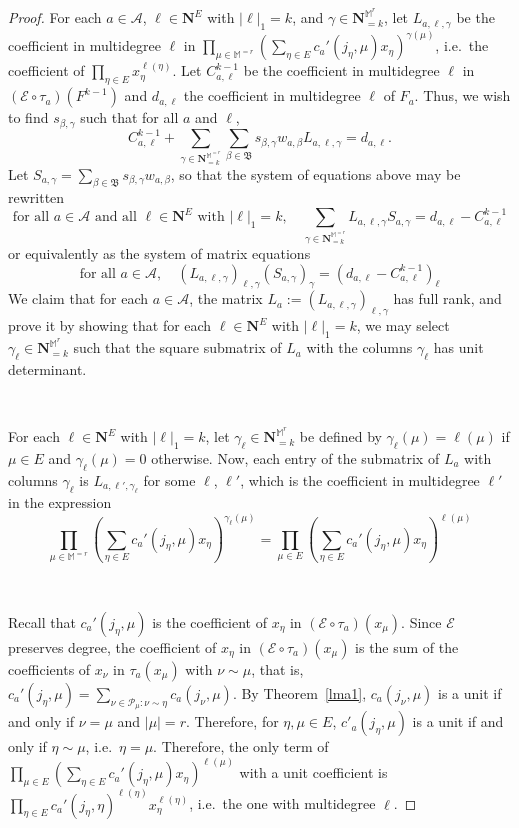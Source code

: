 \documentclass[10pt]{amsart}
\theoremstyle{Theorem}
\theoremstyle{definition}
\newcommand{\NN}{\mathbf N}
\newcommand{\cA}{\mathcal{A}}
\newcommand{\cE}{\mathcal{E}}
\newcommand{\cP}{\mathcal{P}}
\def\cs{s}
\begin{document}
\begin{proof}
For each $a\in \cA$, $\ell\in \NN^E$ with $|\ell|_1=k$, and $\gamma\in \NN_{=k}^{\mathbb M^r}$, let $L_{a,\ell,\gamma}$ be the coefficient in multidegree $\ell$ in $\prod_{\mu\in \mathbb{M}^{=r}}\left(\sum_{\eta\in E}c_a'(j_\eta,\mu)x_\eta\right)^{\gamma(\mu)}$, i.e.\ the coefficient of $\prod_{\eta\in E}x_\eta^{\ell(\eta)}$.  Let $C_{a,\ell}^{k-1}$ be the coefficient in multidegree $\ell$  in $(\cE\circ \tau_a)(F^{k-1})$ and $d_{a,\ell}$ the coefficient in multidegree $\ell$ of $F_a$.  Thus, we wish to find $s_{\beta,\gamma}$ such that for all $a$ and $\ell$,
\[C_{a,\ell}^{k-1} +  \sum_{\gamma\in \NN_{=k}^{\mathbb{M}^{=r}}}\sum_{\beta \in \mathfrak{B}} \cs_{\beta,\gamma}w_{a,\beta}L_{a,\ell,\gamma} = d_{a,\ell}.
\]
Let $S_{a,\gamma} = \sum_{\beta \in \mathfrak{B}} \cs_{\beta,\gamma}w_{a,\beta}$, so that the system of equations above may be rewritten
\[\text{for all }a\in \cA\text{ and all }\ell\in \NN^E\text{ with }|\ell|_1 = k, \quad \sum_{\gamma\in \NN_{=k}^{\mathbb{M}^{=r}}} L_{a,\ell,\gamma}S_{a,\gamma} = d_{a,\ell} - C^{k-1}_{a,\ell}\]
or equivalently as the system of matrix equations
\[\text{for all }a\in \cA, \quad (L_{a,\ell,\gamma})_{\ell,\gamma}(S_{a,\gamma})_\gamma  = (d_{a,\ell} - C^{k-1}_{a,\ell})_\ell\]
We claim that for each $a\in \cA$, the matrix $L_a:=(L_{a,\ell,\gamma})_{\ell,\gamma}$ has full rank, and prove it by showing that for each $\ell\in\NN^E$ with $|\ell|_1=k$, we may select $\gamma_\ell\in \NN_{=k}^{\mathbb M^r}$ such that the square submatrix of $L_a$ with the columns $\gamma_\ell$ has unit determinant.  

\ 

For each $\ell\in\NN^E$ with $|\ell|_1=k$, let $\gamma_\ell\in \NN_{=k}^{\mathbb M^r}$ be defined by $\gamma_\ell(\mu) = \ell(\mu)$ if $\mu\in E$ and $\gamma_\ell(\mu) = 0$ otherwise.  Now, each entry of the submatrix of $L_a$ with columns $\gamma_\ell$ is $L_{a,\ell',\gamma_\ell}$ for some $\ell$, $\ell'$, which is the coefficient in multidegree $\ell'$ in the expression 
\[\prod_{\mu\in \mathbb{M}^{=r}}\left(\sum_{\eta\in E}c_a'(j_\eta,\mu)x_\eta\right)^{\gamma_\ell(\mu)} = \prod_{\mu\in E}\left(\sum_{\eta\in E}c_a'(j_\eta,\mu)x_\eta\right)^{\ell(\mu)}\]

\ 

Recall that $c_a'(j_\eta,\mu)$ is the coefficient of $x_\eta$ in $(\cE\circ\tau_a)(x_\mu)$.  Since $\cE$ preserves degree, the coefficient of $x_\eta$ in $(\cE\circ\tau_a)(x_\mu)$ is the sum of the coefficients of $x_\nu$ in $\tau_a(x_\mu)$ with $\nu\sim \mu$, that is, $c_a'(j_\eta,\mu) = \sum_{\nu\in \cP_\mu\colon \nu\sim \eta} c_a(j_\nu,\mu)$.  By Theorem~\ref{lma1}, $c_a(j_\nu,\mu)$ is a unit if and only if $\nu = \mu$ and $|\mu| = r$.  Therefore, for $\eta,\mu\in E$, $c'_a(j_\eta,\mu)$ is a unit if and only if $\eta\sim \mu$, i.e.\ $\eta = \mu$.  Therefore, the only term of $\prod_{\mu\in E}\left(\sum_{\eta\in E}c_a'(j_\eta,\mu)x_\eta\right)^{\ell(\mu)}$ with a unit coefficient is $\prod_{\eta\in E}c_a'(j_\eta,\eta)^{\ell(\eta)}x_\eta^{\ell(\eta)}$, i.e.\ the one with multidegree $\ell$.


\end{proof}
\end{document}
